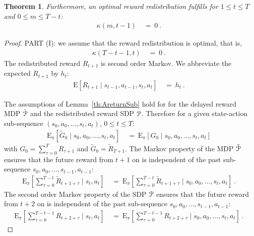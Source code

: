 \documentclass{article}
\newtheorem{theoremA}{Theorem}
\newcommand\EXP{\mathbf{\mathrm{E}}}
\renewcommand{\leq}{\leqslant}
\begin{document}
\begin{appendices}
\begin{theoremA}
Furthermore, an optimal reward redistribution
fulfills for $1 \leq t\leq T$ and $0\leq m\leq T-t$:
\begin{align}
\label{eq:AoptimalCon1}
  \kappa(m,t-1) \ &= \  0 \ . 
\end{align} 
\end{theoremA}


\begin{proof}
\label{c:t2p}
PART (I): we assume that the reward redistribution is optimal, that is,
\begin{align}
  \kappa(T-t-1,t) \ &= \  0 \ .
\end{align} 
The redistributed reward $R_{t+1}$ is second order Markov.
We abbreviate the expected $R_{t+1}$ by $h_t$:
 \begin{align}
    \EXP \left[ R_{t+1} \mid s_{t-1},a_{t-1},s_t,a_t \right] 
    \ &= \ h_t \ .
\end{align} 
  
The assumptions of Lemma~\ref{th:AreturnSub} hold for 
for the delayed reward MDP $\tilde{\mathcal{P}}$ and
the redistributed reward SDP $\mathcal{P}$. 
Therefore for a given state-action sub-sequence
$(s_0,a_0,\ldots,s_t,a_t)$, $0 \leq t \leq T$:
\begin{align}
   \EXP_{\pi} \left[
    \tilde{G}_0 \mid s_0,a_0,\ldots,s_t,a_t \right] \ &= \
   \EXP_{\pi} \left[
    G_0 \mid s_0,a_0,\ldots,s_t, a_t\right] 
  \end{align}
with
$G_0=\sum_{\tau=0}^{T}  R_{\tau+1}$ and $\tilde{G}_0=\tilde{R}_{T+1}$.
The Markov property of the MDP $\tilde{\mathcal{P}}$
ensures that the future reward  from $t+1$ on is independent of
the past sub-sequence $s_0,a_0,\ldots,s_{t-1},a_{t-1}$:
\begin{align}
 \EXP_{\pi} \left[
 \sum_{\tau=0}^{T-t} \tilde{R}_{t+1+\tau} \mid s_t,a_t \right] \ &= \ 
 \EXP_{\pi} \left[
 \sum_{\tau=0}^{T-t} \tilde{R}_{t+1+\tau} \mid 
 s_0,a_0,\ldots,s_t,a_t \right] \ .
 \end{align}
The second order Markov property of the SDP $\mathcal{P}$
ensures that the future reward from $t+2$ on is independent of
the past sub-sequence $s_0,a_0,\ldots,s_{t-1},a_{t-1}$:
\begin{align}
\EXP_{\pi} \left[
 \sum_{\tau=0}^{T-t-1} R_{t+2+\tau} \mid s_t,a_t \right] \ &= \ 
 \EXP_{\pi} \left[
 \sum_{\tau=0}^{T-t-1} R_{t+2+\tau} \mid s_0,a_0,\ldots,s_t,a_t \right] \ .
\end{align}


\end{proof}
\end{appendices}
\end{document}
